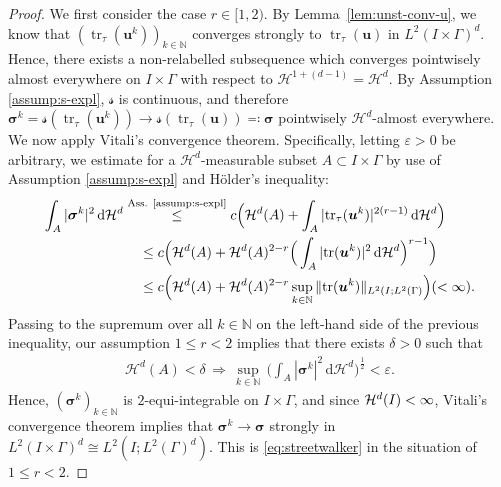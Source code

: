 \documentclass[reqno,a4paper]{amsart}
\def\vec#1{\boldsymbol{#1}}
\def\tr{\mathop{\mathrm{tr}}\nolimits}
\def\bu{\vec{u}}
\def\bsigma{\vec{\sigma}}
\def\Srel{\vec{\mathcal{s}}}
\begin{document}
	\begin{proof}
		We first consider the case $r \in [1,2)$. 
    By Lemma~\ref{lem:unst-conv-u}, we know that $(\tr_{\tau}(\bu^k))_{k\in\mathbb{N}}$ converges strongly to $\tr_{\tau}(\bu)$ in $L^2(I \times \Gamma)^d$. Hence, there exists a non-relabelled subsequence which converges pointwisely almost everywhere on $I\times\Gamma$ with respect to $\mathcal{H}^{1+(d-1)}=\mathcal{H}^{d}$. By Assumption \ref{assump:s-expl}, $\Srel$ is continuous, and therefore $\bsigma^k = \Srel(\tr_\tau(\bu^k))\to\Srel(\tr_{\tau}(\bu))\eqqcolon \bsigma$  pointwisely $\mathcal{H}^{d}$-almost everywhere. We now apply Vitali's convergence theorem. Specifically, letting $\varepsilon>0$ be arbitrary, we estimate for a $\mathcal{H}^{d}$-measurable subset $A\subset I\times \Gamma$ by use of Assumption \ref{assump:s-expl} and H\"{o}lder's inequality:
		\begin{align*}
			\int_{A}|\bsigma^{k}|^{2}\,\mathrm{d}\mathcal{H}^{d} & \stackrel{\text{Ass. \ref{assump:s-expl}}}{\leq} c\Big(\mathcal{H}^{d}(A) + \int_{A} |\mathrm{tr}_{\tau}(\bu^{k})|^{2(r-1)}\,\mathrm{d}\mathcal{H}^{d}\Big) \\ 
			& \;\;\;\;\leq c\Big( \mathcal{H}^{d}(A) + \mathcal{H}^{d}(A)^{2-r}\Big(\int_{A}|\mathrm{tr}(\bu^{k})|^{2}\,\mathrm{d}\mathcal{H}^{d} \Big)^{r-1}\Big) \\ 
			& \;\;\;\;\leq c\Big( \mathcal{H}^{d}(A) + \mathcal{H}^{d}(A)^{2-r}\sup_{k\in\mathbb{N}}\|\mathrm{tr}(\bu^{k})\|_{L^{2}(I;L^{2}(\Gamma)}\Big) (<\infty). 
		\end{align*}
		Passing to the supremum over all $k\in\mathbb{N}$ on the left-hand side of the previous inequality, our assumption $1\leq r<2$ implies that there exists $\delta>0$ such that 
		\begin{align*}
			\mathcal{H}^{d}(A)<\delta \,\Longrightarrow \,\sup_{k\in\mathbb{N}}\,\Big(\int_{A}|\bsigma^{k}|^{2}\,\mathrm{d}\mathcal{H}^{d}\Big)^{\frac{1}{2}}<\varepsilon. 
		\end{align*}
		Hence, $(\bsigma^{k})_{k\in\mathbb{N}}$ is $2$-equi-integrable on $I\times\Gamma$, and since $\mathcal{H}^{d}(I\time\Gamma)<\infty$, Vitali's convergence theorem implies that $\bsigma^{k}\to\bsigma$ strongly in $L^{2}(I\times\Gamma)^{d}\cong L^{2}(I;L^{2}(\Gamma)^{d})$. This is \eqref{eq:streetwalker} in the situation of $1\leq r<2$. 
		

\end{proof}
\end{document}
